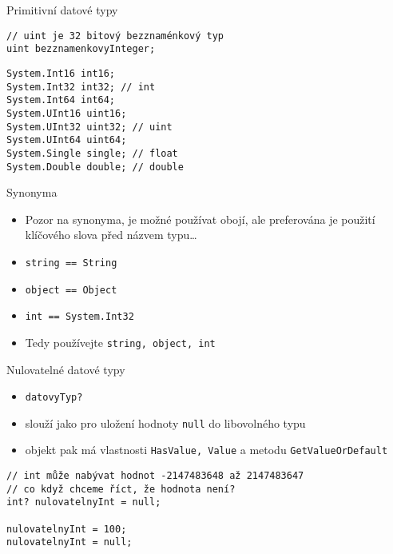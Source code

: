 

\begin{frame}[fragile]
\vfill
\begin{exampleblock}{Primitivní datové typy}
\begin{lstlisting}
// uint je 32 bitový bezznaménkový typ
uint bezznamenkovyInteger;
\end{lstlisting}
\end{exampleblock}
\vfill
\begin{bonusblock}{}
\begin{lstlisting}
System.Int16 int16;
System.Int32 int32; // int
System.Int64 int64;
System.UInt16 uint16;
System.UInt32 uint32; // uint
System.UInt64 uint64;
System.Single single; // float
System.Double double; // double
\end{lstlisting}
\end{bonusblock}
\vfill
\end{frame}


\begin{frame}[fragile]
\begin{block}{Synonyma}
\begin{itemize}
\item Pozor na synonyma, je možné používat obojí, ale preferována je použití klíčového slova před názvem typu\ldots
\item \lstinline|string == String|
\item \lstinline|object == Object|
\item \lstinline|int == System.Int32|
\item Tedy používejte \lstinline|string, object, int|
\end{itemize}
\end{block}
\end{frame}

\begin{frame}[fragile]
\vfill
\begin{block}{Nulovatelné datové typy}
\begin{itemize}
\item \lstinline|datovyTyp?|
\item slouží jako  pro uložení hodnoty \lstinline|null| do libovolného typu
\item objekt pak má vlastnosti \lstinline|HasValue, Value| a metodu \lstinline|GetValueOrDefault|
\end{itemize}
\end{block}
\vfill
\begin{yesblock}
\begin{lstlisting}
// int může nabývat hodnot -2147483648 až 2147483647
// co když chceme říct, že hodnota není?
int? nulovatelnyInt = null;

nulovatelnyInt = 100;
nulovatelnyInt = null;

\end{lstlisting}
\end{yesblock}
\vfill
\end{frame}




